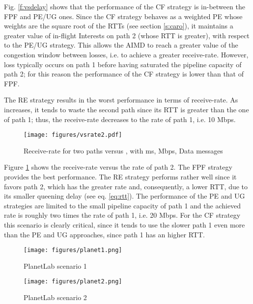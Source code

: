 \documentclass{sig-alternate-10pt}
\begin{document}
Fig. \ref{f:vsdelay} shows that the performance of the CF strategy is in-between the FPF and PE/UG ones. Since the CF strategy behaves as a weighted PE whose weights are the square root of the RTTs (see section \ref{s:caro}), it maintains a greater value of in-flight Interests on path 2 (whose RTT is greater), with respect to the PE/UG strategy. This allows the AIMD to reach a greater value of the congestion window between losses, i.e. to achieve a greater receive-rate. However, loss typically occurs on path 1 before having saturated the pipeline capacity of path 2; for this reason the performance of the CF strategy is lower than that of FPF.

The RE strategy results in the worst performance in terms of receive-rate. As  increases, it tends to waste the second path since its RTT is greater than the one of path 1; thus, the receive-rate decreases to the rate of path 1, i.e. 10 Mbps.

\begin{figure}[t]
\centering
\texttt{[image: figures/vsrate2.pdf]}
\caption{Receive-rate  for two paths versus , with  ms,  Mbps,  Data messages}
\label{f:vsrate}
\vspace{-10pt}
\end{figure}

Figure \ref{f:vsrate} shows the receive-rate versus the rate  of path 2. The FPF strategy provides the best performance. The RE strategy performs rather well since it favors path 2, which has the greater rate and, consequently, a lower RTT, due to its smaller queening delay (see eq. \ref{eq:rtt}). The performance of the PE and UG strategies are limited to the small pipeline capacity of path 1 and the achieved rate is roughly two times the rate of path 1, i.e. 20 Mbps. For the CF strategy this scenario is clearly critical, since it tends to use the slower path 1 even more than the PE and UG approaches, since path 1 has an higher RTT.

\begin{figure}[t]
\centering
\texttt{[image: figures/planet1.png]}
\caption{PlanetLab scenario 1}
\label{f:plscen1}
\vspace{-10pt}
\end{figure}

\begin{figure}[t]
\centering
\texttt{[image: figures/planet2.png]}
\caption{PlanetLab scenario 2}
\label{f:plscen2}
\vspace{-10pt}
\end{figure}
\end{document}
